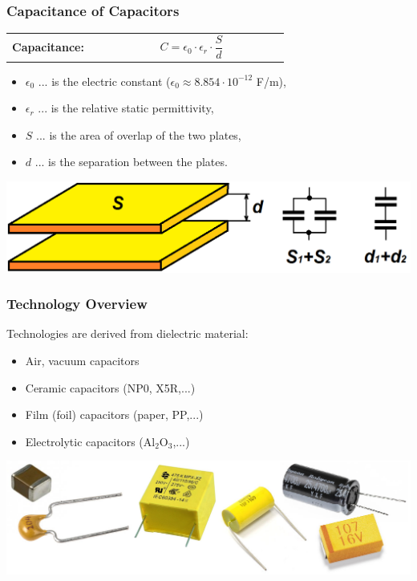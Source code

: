 \documentclass{beamer}
\begin{document}
	\begin{frame}
    \frametitle{Capacitance of Capacitors}
		\begin{tabular}{p{0.3\linewidth} p{0.6\linewidth}}
		\textbf{Capacitance:} & $$C= \epsilon_0 \cdot \epsilon_r \cdot \frac{S}{d}$$
		\end{tabular}
		
		\begin{itemize}
			\item $\epsilon_0$ ... is the electric constant ($\epsilon_0\approx 8.854 \cdot 10^{-12}$ F/m),
			\item $\epsilon_r$ ... is the relative static permittivity,
			\item $S$ ... is the area of overlap of the two plates,
			\item $d$ ... is the separation between the plates.
		\end{itemize}
		\begin{center}
			\includegraphics[scale=0.3]{obr01_kapacita.png}
		\end{center}
  \end{frame}
	\begin{frame}
    \frametitle{Technology Overview}
		Technologies are derived from dielectric material:
		
		\begin{itemize}
			\item Air, vacuum capacitors
			\item Ceramic capacitors (NP0, X5R,...)
			\item Film (foil) capacitors (paper, PP,...)
			\item Electrolytic capacitors (Al$_2$O$_3$,...)
		\end{itemize}
		\begin{center}
			\includegraphics[scale=0.35]{obr02_kondenzatory.png}
		\end{center}
  \end{frame}
\end{document}
